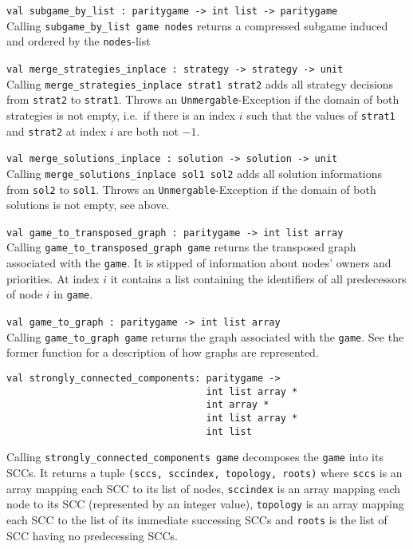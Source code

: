 \begin{description}
\item \verb+val subgame_by_list : paritygame -> int list -> paritygame+ \ \\
Calling \verb+subgame_by_list game nodes+ returns a compressed subgame induced and ordered by the \verb+nodes+-list

\item \verb+val merge_strategies_inplace : strategy -> strategy -> unit+ \ \\
Calling \verb+merge_strategies_inplace strat1 strat2+ adds all strategy decisions from \verb+strat2+ to
\verb+strat1+. Throws an \verb+Unmergable+-Exception if the domain of both strategies is not empty, i.e.\ if
there is an index $i$ such that the values of \verb+strat1+ and \verb+strat2+ at index $i$ are both not
$-1$.

\item \verb+val merge_solutions_inplace : solution -> solution -> unit+ \ \\
Calling \verb+merge_solutions_inplace sol1 sol2+ adds all solution informations from \verb+sol2+ to \verb+sol1+.
Throws an \verb+Unmergable+-Exception if the domain of both solutions is not empty, see above.

\item \verb+val game_to_transposed_graph : paritygame -> int list array+ \ \\
Calling \verb+game_to_transposed_graph game+ returns the transposed graph associated with the \verb+game+. It is
stipped of information about nodes' owners and priorities. At index $i$ it contains a list containing the
identifiers of all predecessors of node $i$ in \verb+game+.

\item \verb+val game_to_graph : paritygame -> int list array+ \ \\
Calling \verb+game_to_graph game+ returns the graph associated with the \verb+game+. See the former function
for a description of how graphs are represented.

\item
\begin{verbatim}
val strongly_connected_components: paritygame ->
                                   int list array *
                                   int array *
                                   int list array *
                                   int list
\end{verbatim}
Calling \verb+strongly_connected_components game+ decomposes the \verb+game+ into its SCCs. It returns a tuple
\verb+(sccs, sccindex, topology, roots)+ where \verb+sccs+ is an array mapping each SCC to its list of nodes,
\verb+sccindex+ is an array mapping each node to its SCC (represented by an integer value), \verb+topology+ is an
array mapping each SCC to the list of its immediate successing SCCs and \verb+roots+ is the list of SCC having no
predecessing SCCs.


\end{description}

